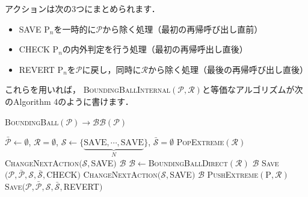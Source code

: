 ﻿\documentclass[a4paper]{jsarticle}
\begin{document}
アクションは次の3つにまとめられます．
\begin{itemize}
\item SAVE $\mathrm{P}_{n}$を一時的に$\mathcal{P}$から除く処理（最初の再帰呼び出し直前）
\item CHECK $\mathrm{P}_{n}$の内外判定を行う処理（最初の再帰呼出し直後）
\item REVERT $\mathrm{P}_{n}$を$\mathcal{P}$に戻し，同時に$\mathcal{R}$から除く処理（最後の再帰呼び出し直後）
\end{itemize}
これらを用いれば，
\textsc{BoundingBallInternal}$(\mathcal{P},\mathcal{R})$と等価なアルゴリズムが次のAlgorithm 4のように書けます．

\begin{algorithm}[h]
\caption{\textsc{BoundingBall}$(\mathcal{P})\rightarrow\mathcal{BB}(\mathcal{P})$}
\begin{algorithmic}[1]
\State $\bar{\mathcal{P}}\leftarrow\emptyset$, $\mathcal{R}=\emptyset$, $\mathcal{S}\leftarrow\{\underbrace{\mbox{SAVE},\cdots,\mbox{SAVE}}_{N}\}$, $\bar{\mathcal{S}}=\emptyset$
    \State \textsc{PopExtreme}$(\mathcal{R})$
    \State \textsc{ChangeNextAction}$(\mathcal{S},$SAVE$)$
       $\mathcal{B}$
    \EndIf
  \EndIf
    $\mathcal{B}\leftarrow$\textsc{BoundingBallDirect}$(\mathcal{R})$
       $\mathcal{B}$
    \EndIf
  \Else
      \State \textsc{Save}$(\mathcal{P},\bar{\mathcal{P}},\mathcal{S},\bar{\mathcal{S}},$CHECK$)$
    \Else
          \State \textsc{ChangeNextAction}$(\mathcal{S},$SAVE$)$
             $\mathcal{B}$
          \EndIf
        \Else
          \State \textsc{PushExtreme}$(\mathrm{P},\mathcal{R})$
          \State \textsc{Save}$(\mathcal{P},\bar{\mathcal{P}},\mathcal{S},\bar{\mathcal{S}},$REVERT$)$
        \EndIf
      \EndIf
    \EndIf
  \EndIf
\EndWhile
\end{algorithmic}
\end{algorithm}
\end{document}
